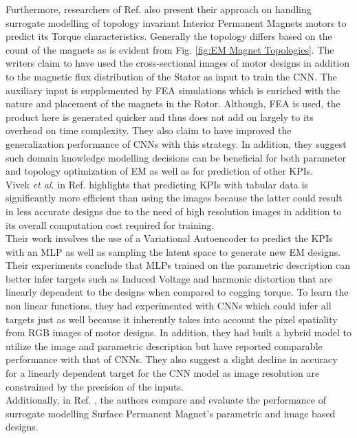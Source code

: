 \documentclass{report} %
\begin{document}
Furthermore, researchers of Ref. \cite{EM CNN-2024} also present their approach on handling surrogate modelling of topology invariant Interior 
Permanent Magnets motors to predict its Torque characteristics.
Generally the topology differs based on the count of the magnets as is evident from Fig. \ref{fig:EM Magnet Topologies}.
The writers claim to have used the cross-sectional images of motor designs in addition to the magnetic flux distribution of the Stator as input to train the \ac{CNN}. 
The auxiliary input is supplemented by \ac{FEA} simulations which is enriched with the nature and placement of 
the magnets in the Rotor. Although, \ac{FEA} is used, the product here is generated quicker and thus does not add on largely to its overhead on time complexity. 
They also claim to have improved the generalization performance of \ac{CNN}s with this strategy. In addition, they suggest such domain knowledge modelling decisions 
can be beneficial for both parameter and topology optimization of \ac{EM} as well as for prediction of other \ac{KPI}s.\\

Vivek \textit{et al.} in Ref. \cite{VAE-MT-2022} highlights that predicting \ac{KPI}s with tabular data is significantly more efficient than 
using the images because the latter could result in less accurate designs due to the need of high resolution images in addition to its overall computation cost 
required for training. \\
Their work involves the use of a Variational Autoencoder to predict the \ac{KPI}s with an \ac{MLP} as well as sampling the latent space to generate new \ac{EM} designs.
Their experiments conclude that \ac{MLP}s trained on the parametric description can better infer targets such as Induced Voltage and harmonic distortion 
that are linearly dependent to the designs when compared to cogging torque.
To learn the non linear functions, they had experimented with \ac{CNN}s which could infer all targets just as well because it inherently takes 
into account the pixel spatiality from RGB images of motor designs. In addition, they had built a hybrid model to utilize the image and parametric 
description but have reported comparable performance with that of \ac{CNN}s.
They also suggest a slight decline in accuracy for a linearly dependent target for the \ac{CNN} model as image resolution are constrained by the precision of the inputs.\\
Additionally, in Ref. \cite{EM SM-2023}, the authors compare and evaluate the performance of surrogate modelling Surface Permanent Magnet's parametric and image based designs.
\end{document}
